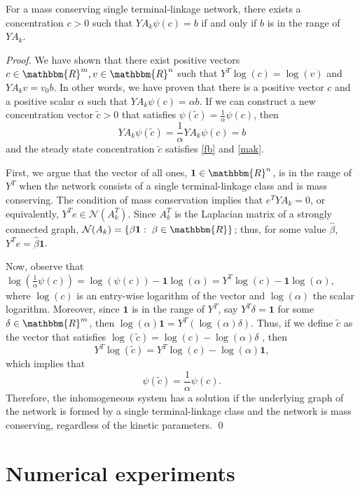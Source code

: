 \documentclass[smallextended]{svjour3}       %
\newcommand*{\0}{\mathbf{0}}
\newcommand*{\1}{\mathbf{1}}
\newcommand*{\R}{\mathbbm{R}}
\begin{document}
\begin{theorem}\label{thm:scaling}
	For a mass conserving single terminal-linkage network, there exists a
	concentration $c>0$ such that $YA_k\psi(c) = b$ if and only if $b$ is in the
	range of $YA_k$. 
\end{theorem}

\begin{proof}
	We have shown that there exist positive vectors $c \in \R^m, v \in \R^n$ such
	that $Y^T \log(c) = \log (v)$ and $Y A_k v = v_0 b$.  In other words, we have
	proven that there is a positive vector $c$ and a positive scalar $\alpha$
	such that $Y A_k \psi(c) = \alpha b$.  If we can construct a new
	concentration vector $\tilde c > 0$ that satisfies $\psi(\tilde c) =
	\frac{1}{\alpha}\psi(c)$, then
	\[
		YA_k\psi(\tilde c) = \frac{1}{\alpha}YA_k\psi(c) = b
	\]
	and the steady state concentration $\tilde c$ satisfies \eqref{fb} and
	\eqref{mak}.  

	First, we argue that the vector of all ones, $\1 \in \R^n$, is in the range
	of $Y^T$ when the network consists of a single terminal-linkage class and
	is mass conserving. The condition of mass conservation implies that $e^T Y A_k = 0$, 
	or equivalently, $Y^T e \in \mathcal{N} (A_k^T)$.  Since $A_k^T$ is the 
	Laplacian matrix of a strongly connected graph, $\mathcal{N}(A_k) = \{\beta
	\1 :\; \beta \in \R\}$; thus, for some value $\hat \beta$, $Y^T e = \hat\beta
	\1$. 
	
	Now, observe that $\log\left(\frac{1}{\alpha}\psi(c) \right) =
	\log(\psi(c))-\1\log(\alpha) = Y^T\log(c) - \1\log(\alpha)$, where $\log(c)$
	is an entry-wise logarithm of the vector and $\log(\alpha)$ the scalar
	logarithm. Moreover, since $\1$ is in the range of $Y^T$, say $Y^T \delta =
	\1$ for some $\delta \in \R^m$, then $\log(\alpha)\1 =
	Y^T(\log(\alpha)\delta)$. Thus, if we define $\tilde c$ as the vector that
	satisfies  $\log(\tilde c) = \log(c) - \log(\alpha)\delta$ , then 
	\[
	Y^T\log(\tilde c) = Y^T\log(c) - \log(\alpha)\1,
	\] 
	which implies that 
	\[
	\psi(\tilde c) = \frac{1}{\alpha}\psi(c).
	\] 
	Therefore, the inhomogeneous system has a solution if the underlying graph of
	the network is formed by a single terminal-linkage class and the network is 
	mass conserving, regardless of the kinetic parameters.
   \qed
\end{proof}


\section{Numerical experiments}
\label{sec:experiments}
\end{document}
